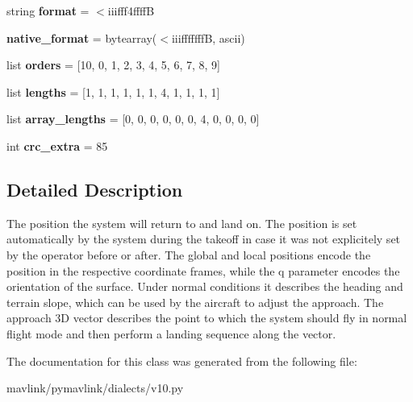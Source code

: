 \begin{DoxyCompactItemize}
\item 
\mbox{\label{classpymavlink_1_1dialects_1_1v10_1_1MAVLink__set__home__position__message_a6a260356a95c8f072a5b35a069a8117b}} 
string {\bfseries format} = \textquotesingle{}$<$iiifff4ffffB\textquotesingle{}
\item 
\mbox{\label{classpymavlink_1_1dialects_1_1v10_1_1MAVLink__set__home__position__message_a0373b727bde5a33b72d1a08bc80c921d}} 
{\bfseries native\+\_\+format} = bytearray(\textquotesingle{}$<$iiifffffffB\textquotesingle{}, \textquotesingle{}ascii\textquotesingle{})
\item 
\mbox{\label{classpymavlink_1_1dialects_1_1v10_1_1MAVLink__set__home__position__message_ab0499d7758eb961736ebf8c84ace65ed}} 
list {\bfseries orders} = \mbox{[}10, 0, 1, 2, 3, 4, 5, 6, 7, 8, 9\mbox{]}
\item 
\mbox{\label{classpymavlink_1_1dialects_1_1v10_1_1MAVLink__set__home__position__message_ab7d8a3009444eae756c3ec62d78191e2}} 
list {\bfseries lengths} = \mbox{[}1, 1, 1, 1, 1, 1, 4, 1, 1, 1, 1\mbox{]}
\item 
\mbox{\label{classpymavlink_1_1dialects_1_1v10_1_1MAVLink__set__home__position__message_ae063d78e8e7daf75fe52020a8821de22}} 
list {\bfseries array\+\_\+lengths} = \mbox{[}0, 0, 0, 0, 0, 0, 4, 0, 0, 0, 0\mbox{]}
\item 
\mbox{\label{classpymavlink_1_1dialects_1_1v10_1_1MAVLink__set__home__position__message_a85054773ba79acd36fc125771513465f}} 
int {\bfseries crc\+\_\+extra} = 85
\end{DoxyCompactItemize}


\subsection{Detailed Description}
\begin{DoxyVerb}The position the system will return to and land on. The
position is set automatically by the system during the takeoff
in case it was not explicitely set by the operator before or
after. The global and local positions encode the position in
the respective coordinate frames, while the q parameter
encodes the orientation of the surface. Under normal
conditions it describes the heading and terrain slope, which
can be used by the aircraft to adjust the approach. The
approach 3D vector describes the point to which the system
should fly in normal flight mode and then perform a landing
sequence along the vector.
\end{DoxyVerb}
 

The documentation for this class was generated from the following file\+:\begin{DoxyCompactItemize}
\item 
mavlink/pymavlink/dialects/v10.\+py\end{DoxyCompactItemize}
